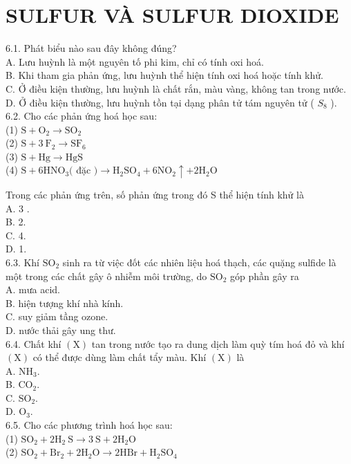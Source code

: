 \documentclass[10pt]{article}
\begin{document}
\section*{SULFUR VÀ SULFUR DIOXIDE}
6.1. Phát biểu nào sau đây không đúng?\\
A. Lưu huỳnh là một nguyên tố phi kim, chỉ có tính oxi hoá.\\
B. Khi tham gia phản ứng, lưu huỳnh thể hiện tính oxi hoá hoặc tính khử.\\
C. Ở điều kiện thường, lưu huỳnh là chất rắn, màu vàng, không tan trong nước.\\
D. Ở điều kiện thường, lưu huỳnh tồn tại dạng phân tử tám nguyên tử ( $S_{8}$ ).\\
6.2. Cho các phản ứng hoá học sau:\\
(1) $\mathrm{S}+\mathrm{O}_{2} \rightarrow \mathrm{SO}_{2}$\\
(2) $\mathrm{S}+3 \mathrm{~F}_{2} \rightarrow \mathrm{SF}_{6}$\\
(3) $\mathrm{S}+\mathrm{Hg} \rightarrow \mathrm{HgS}$\\
(4) $\mathrm{S}+6 \mathrm{HNO}_{3}($ đặc $) \rightarrow \mathrm{H}_{2} \mathrm{SO}_{4}+6 \mathrm{NO}_{2} \uparrow+2 \mathrm{H}_{2} \mathrm{O}$

Trong các phản ứng trên, số phản ứng trong đó S thể hiện tính khử là\\
A. 3 .\\
B. 2.\\
C. 4.\\
D. 1.\\
6.3. Khí $\mathrm{SO}_{2}$ sinh ra từ việc đốt các nhiên liệu hoá thạch, các quặng sulfide là một trong các chất gây ô nhiễm môi trường, do $\mathrm{SO}_{2}$ góp phần gây ra\\
A. mưa acid.\\
B. hiện tượng khí nhà kính.\\
C. suy giảm tầng ozone.\\
D. nước thải gây ung thư.\\
6.4. Chất khí $(\mathrm{X})$ tan trong nước tạo ra dung dịch làm quỳ tím hoá đỏ và khí $(\mathrm{X})$ có thể được dùng làm chất tẩy màu. Khí $(\mathrm{X})$ là\\
A. $\mathrm{NH}_{3}$.\\
B. $\mathrm{CO}_{2}$.\\
C. $\mathrm{SO}_{2}$.\\
D. $\mathrm{O}_{3}$.\\
6.5. Cho các phương trình hoá học sau:\\
(1) $\mathrm{SO}_{2}+2 \mathrm{H}_{2} \mathrm{~S} \rightarrow 3 \mathrm{~S}+2 \mathrm{H}_{2} \mathrm{O}$\\
(2) $\mathrm{SO}_{2}+\mathrm{Br}_{2}+2 \mathrm{H}_{2} \mathrm{O} \rightarrow 2 \mathrm{HBr}+\mathrm{H}_{2} \mathrm{SO}_{4}$
\end{document}
